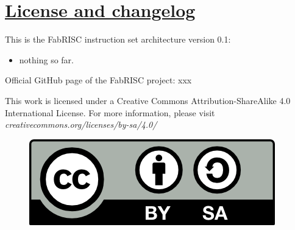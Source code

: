 \section[License and changelog]{\LARGE\underline{License and changelog}}

    This is the FabRISC instruction set architecture version 0.1:

    \begin{itemize}

        \item nothing so far.

    \end{itemize}

    \vspace{10pt}

    Official GitHub page of the FabRISC project: xxx

    \vspace{10pt}

    This work is licensed under a Creative Commons Attribution-ShareAlike 4.0 International License. For more information, please visit \textit{creativecommons.org/licenses/by-sa/4.0/}

    \begin{figure}[hbt!]

        \includegraphics[scale = 0.8]{./Images/LICENSE.png}
        \label{fig:LICENSE}
        
    \end{figure}